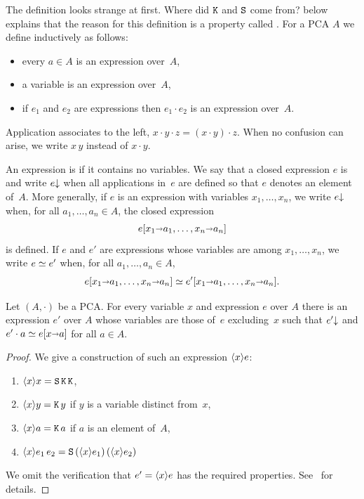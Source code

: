 \noindent
The definition looks strange at first. Where did $\mathtt{K}$ and $\mathtt{S}$
come from?  below explains
that the reason for this definition is a property called
.
%
For a PCA $A$ we define  inductively as
follows:
%
\begin{itemize}
\item every $a \in A$ is an expression over~$A$,
\item a variable is an expression over~$A$,
\item if $e_1$ and $e_2$ are expressions then $e_1 \cdot e_2$ is an
  expression over~$A$.
\end{itemize}
%
Application associates to the left, $x \cdot y \cdot z = (x \cdot y) \cdot z$.
When no confusion can arise, we write $x \, y$ instead of $x \cdot y$.

An expression is  if it contains no variables. We say
that a closed expression $e$ is  and write $e{\downarrow}$
when all applications in~$e$ are defined so that $e$ denotes an
element of~$A$. More generally, if $e$ is an expression with variables
$x_1, \ldots, x_n$, we write $e{\downarrow}$ when, for all $a_1, \ldots,
a_n \in A$, the closed expression
%
\begin{equation*}
  e[x_1 {\shortrightarrow} a_1, \ldots, x_n {\shortrightarrow} a_n]
\end{equation*}
%
is defined. If $e$ and $e'$ are expressions whose variables are among
$x_1, \ldots, x_n$, we write $e \simeq e'$ when, for all $a_1, \ldots,
a_n \in A$,
%
\begin{equation*}
  e[x_1 {\shortrightarrow} a_1, \ldots, x_n {\shortrightarrow} a_n] \simeq
  e'[x_1 {\shortrightarrow} a_1, \ldots, x_n {\shortrightarrow} a_n].
\end{equation*}

\begin{theorem}
  \label{th:combinatory-completeness}
  Let $(A, {\cdot})$ be a PCA. For every variable $x$ and expression
  $e$ over $A$ there is an expression $e'$ over $A$ whose variables
  are those of~$e$ excluding~$x$ such that $e'{\downarrow}$ and $e'
  \cdot a \simeq e[x {\shortrightarrow} a]$ for all $a \in A$.
\end{theorem}

\begin{proof}
  We give a construction of such an expression $\langle x \rangle e$:
  \begin{enumerate}
  \item $\langle x \rangle x = \mathtt{S}\, \mathtt{K}\, \mathtt{K}$,
  \item $\langle x \rangle y = \mathtt{K}\, y$ if $y$ is a variable distinct from~$x$,
  \item $\langle x \rangle a = \mathtt{K}\, a$ if $a$ is an element of~$A$,
  \item $\langle x \rangle{e_1\, e_2} = \mathtt{S}\, (\langle x \rangle e_1)\, (\langle x \rangle e_2)$
  \end{enumerate}
  We omit the verification that $e' = \langle x \rangle e$ has the required
  properties. See~ for details.
\end{proof}


